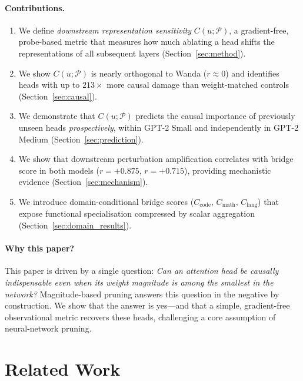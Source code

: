 \documentclass[11pt,a4paper]{article}
\theoremstyle{definition}
\theoremstyle{plain}
\begin{document}
\paragraph{Contributions.}
\begin{enumerate}[leftmargin=*,topsep=2pt,itemsep=2pt]
    \item We define \emph{downstream representation sensitivity}
    $C(u;\mathcal{P})$, a gradient-free, probe-based metric that measures
    how much ablating a head shifts the representations of all subsequent
    layers (Section~\ref{sec:method}).
    \item We show $C(u;\mathcal{P})$ is nearly orthogonal to Wanda
    ($r\approx 0$) and identifies heads with up to $213\times$ more causal
    damage than weight-matched controls (Section~\ref{sec:causal}).
    \item We demonstrate that $C(u;\mathcal{P})$ predicts the causal
    importance of previously unseen heads \emph{prospectively}, within
    GPT-2 Small and independently in GPT-2 Medium
    (Section~\ref{sec:prediction}).
    \item We show that downstream perturbation amplification
    correlates with bridge score in both models ($r=+0.875$, $r=+0.715$),
    providing mechanistic evidence
    (Section~\ref{sec:mechanism}).
    \item We introduce domain-conditional bridge scores
    ($C_{\text{code}},\, C_{\text{math}},\, C_{\text{lang}}$) that expose
    functional specialisation compressed by scalar aggregation
    (Section~\ref{sec:domain_results}).
\end{enumerate}

\paragraph{Why this paper?}
This paper is driven by a single question: \emph{Can an attention head be
causally indispensable even when its weight magnitude is among the smallest
in the network?} Magnitude-based pruning answers this question in the
negative by construction. We show that the answer is yes---and that a
simple, gradient-free observational metric recovers these heads,
challenging a core assumption of neural-network pruning.

\section{Related Work}
\label{sec:related}
\end{document}
